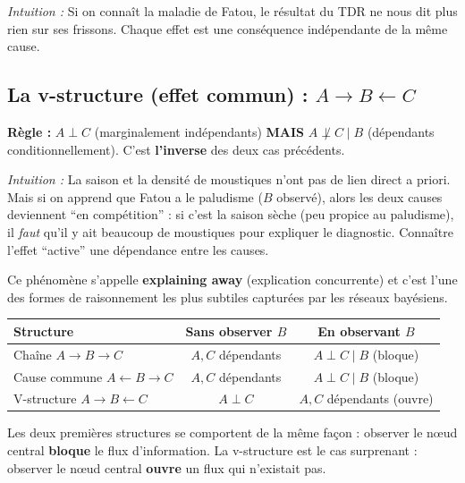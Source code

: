 \documentclass[11pt,a4paper]{article}
\begin{document}
\textit{Intuition :} Si on connaît la maladie de Fatou, le résultat du TDR ne nous dit plus rien sur ses frissons. Chaque effet est une conséquence indépendante de la même cause.

\subsection{La v-structure (effet commun) : $A \to B \leftarrow C$}

\textbf{Règle :} $A \perp C$ (marginalement indépendants) \textbf{MAIS} $A \not\perp C \mid B$ (dépendants conditionnellement). C'est \textbf{l'inverse} des deux cas précédents.

\textit{Intuition :} La saison et la densité de moustiques n'ont pas de lien direct a priori. Mais si on apprend que Fatou a le paludisme ($B$ observé), alors les deux causes deviennent ``en compétition'' : si c'est la saison sèche (peu propice au paludisme), il \textit{faut} qu'il y ait beaucoup de moustiques pour expliquer le diagnostic. Connaître l'effet ``active'' une dépendance entre les causes.

Ce phénomène s'appelle \textbf{explaining away} (explication concurrente) et c'est l'une des formes de raisonnement les plus subtiles capturées par les réseaux bayésiens.

\begin{attentionbox}
\begin{center}
\begin{tabular}{lcc}
\toprule
\textbf{Structure} & \textbf{Sans observer $B$} & \textbf{En observant $B$} \\
\midrule
Chaîne $A \to B \to C$ & $A, C$ dépendants & $A \perp C \mid B$ (bloque) \\
Cause commune $A \leftarrow B \to C$ & $A, C$ dépendants & $A \perp C \mid B$ (bloque) \\
V-structure $A \to B \leftarrow C$ & $A \perp C$ & $A, C$ dépendants (ouvre) \\
\bottomrule
\end{tabular}
\end{center}

Les deux premières structures se comportent de la même façon : observer le nœud central \textbf{bloque} le flux d'information. La v-structure est le cas surprenant : observer le nœud central \textbf{ouvre} un flux qui n'existait pas.
\end{attentionbox}

\end{document}
